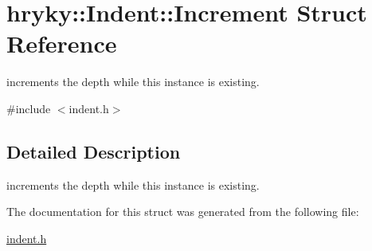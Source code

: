 \hypertarget{structhryky_1_1_indent_1_1_increment}{\section{hryky\-:\-:Indent\-:\-:Increment Struct Reference}
\label{structhryky_1_1_indent_1_1_increment}
}


increments the depth while this instance is existing.  




{\ttfamily \#include $<$indent.\-h$>$}



\subsection{Detailed Description}
increments the depth while this instance is existing. 

The documentation for this struct was generated from the following file\-:\begin{DoxyCompactItemize}
\item 
\hyperlink{indent_8h}{indent.\-h}\end{DoxyCompactItemize}
